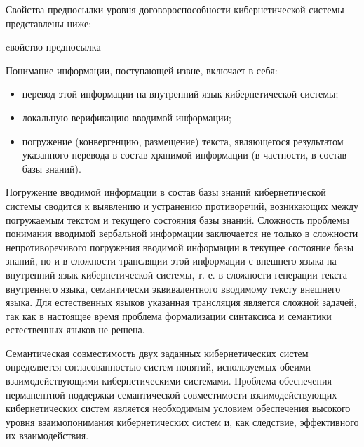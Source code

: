Свойства-предпосылки уровня договороспособности кибернетической системы представлены ниже:

\begin{SCn}
\begin{scnrelfromlist}{cвойство-предпосылка}
\end{scnrelfromlist}
\end{SCn}

Понимание информации, поступающей извне, включает в себя:
\begin{itemize}
    \item{перевод этой информации на внутренний язык кибернетической системы;}
    \item{локальную верификацию вводимой информации;}
    \item{погружение (конвергенцию, размещение) текста, являющегося результатом указанного перевода в состав хранимой информации (в частности, в состав базы знаний).}
\end{itemize}

Погружение вводимой информации в состав базы знаний кибернетической системы сводится к выявлению и устранению противоречий, возникающих между погружаемым текстом и текущего состояния базы знаний.
Сложность проблемы понимания вводимой вербальной информации заключается не только в сложности непротиворечивого погружения вводимой информации в текущее состояние базы знаний, но и в сложности трансляции этой информации с внешнего языка на внутренний язык кибернетической системы, т. е. в сложности генерации текста внутреннего языка, семантически эквивалентного вводимому тексту внешнего языка.
Для естественных языков указанная трансляция является сложной задачей, так как в настоящее время проблема формализации синтаксиса и семантики естественных языков не решена.

Семантическая совместимость двух заданных кибернетических систем определяется согласованностью систем понятий, используемых обеими взаимодействующими кибернетическими системами.
Проблема обеспечения перманентной поддержки семантической совместимости взаимодействующих кибернетических систем является необходимым условием обеспечения высокого уровня взаимопонимания кибернетических систем и, как следствие, эффективного их взаимодействия.


